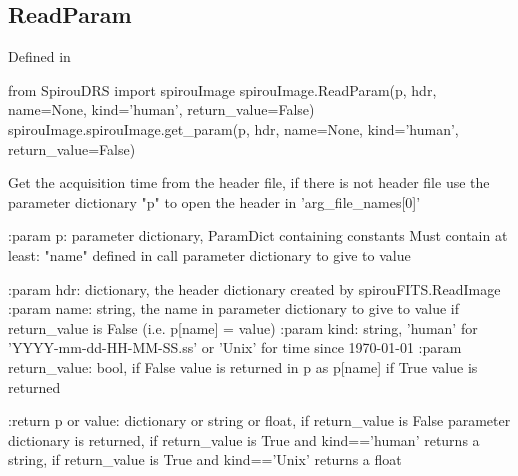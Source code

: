 \noindent\begin{minipage}{\textwidth}
\subsection{ReadParam}

Defined in \spirouImage{}

\begin{pythonbox}
from SpirouDRS import spirouImage
spirouImage.ReadParam(p, hdr, name=None, kind='human', return_value=False)
spirouImage.spirouImage.get_param(p, hdr, name=None, kind='human', return_value=False)
\end{pythonbox}

\begin{pythondocstring}
Get the acquisition time from the header file, if there is not header file
use the parameter dictionary "p" to open the header in 'arg_file_names[0]'

:param p: parameter dictionary, ParamDict containing constants
    Must contain at least:
        "name" defined in call
        parameter dictionary to give to value

:param hdr: dictionary, the header dictionary created by
            spirouFITS.ReadImage
:param name: string, the name in parameter dictionary to give to value
             if return_value is False (i.e. p[name] = value)
:param kind: string, 'human' for 'YYYY-mm-dd-HH-MM-SS.ss' or 'Unix'
             for time since 1970-01-01
:param return_value: bool, if False value is returned in p as p[name]
                     if True value is returned

:return p or value: dictionary or string or float, if return_value is False
                    parameter dictionary is returned, if return_value is
                    True and kind=='human' returns a string, if return_value
                    is True and kind=='Unix' returns a float
\end{pythondocstring}
\end{minipage}


